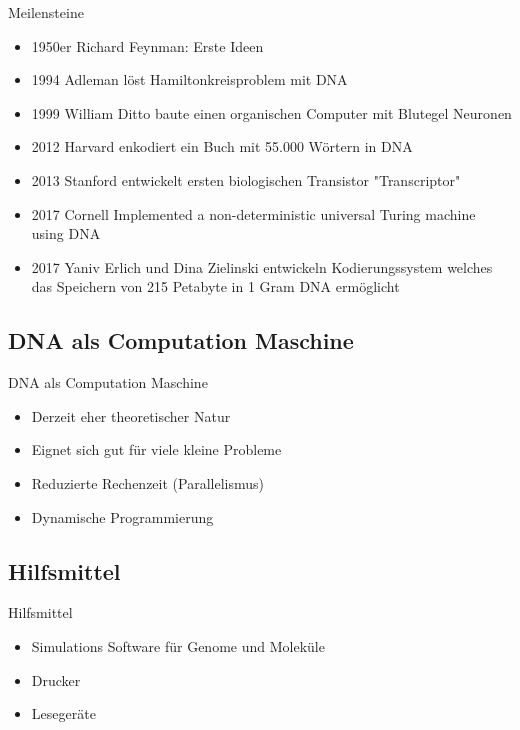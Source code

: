 \documentclass[aspectratio=1610]{beamer}
\begin{document}
\begin{frame}[label={sec:org2bbea22}]{Meilensteine}
\begin{itemize}
\item 1950er Richard Feynman: Erste Ideen
\item 1994 Adleman löst Hamiltonkreisproblem mit DNA
\item 1999 William Ditto baute einen organischen Computer mit Blutegel Neuronen
\item 2012 Harvard enkodiert ein Buch mit 55.000 Wörtern in DNA
\item 2013 Stanford entwickelt ersten biologischen Transistor "Transcriptor"
\item 2017 Cornell Implemented a non-deterministic universal Turing machine using DNA
\item 2017 Yaniv Erlich und Dina Zielinski entwickeln Kodierungssystem welches das Speichern von 215 Petabyte in 1 Gram DNA ermöglicht
\end{itemize}
\end{frame}

\subsection{DNA als Computation Maschine}
\label{sec:org601d033}

\begin{frame}[label={sec:org79fdf56}]{DNA als Computation Maschine}
\begin{itemize}
\item Derzeit eher theoretischer Natur
\item Eignet sich gut für viele kleine Probleme
\item Reduzierte Rechenzeit (Parallelismus)
\item Dynamische Programmierung
\end{itemize}
\end{frame}

\subsection{Hilfsmittel}
\label{sec:org034f50a}

\begin{frame}[label={sec:org337e70a}]{Hilfsmittel}
\begin{itemize}
\item Simulations Software für Genome und Moleküle
\item Drucker
\item Lesegeräte
\end{itemize}
\end{frame}
\end{document}
